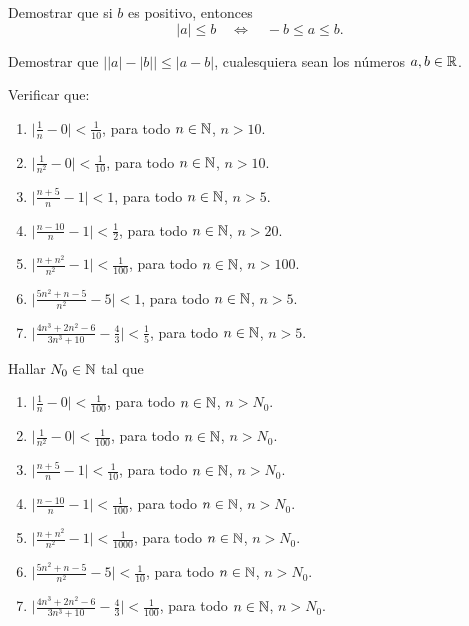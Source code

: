     \item* Demostrar que si $b$ es positivo, entonces
    \[
        |a| \le b \quad\iff\quad -b \le a \le b.
    \]

    \item Demostrar que $\big| |a|-|b| \big| \le |a-b|$, cualesquiera sean los números $a,b\in\mathbb{R}$.



    \item Verificar que:
    \begin{enumerate}
        \item $\Big|\frac1n - 0\Big| < \frac1{10}$, para todo $n\in\mathbb{N}$, $n > 10$.
        \item $\Big|\frac1{n^2} - 0\Big| < \frac1{10}$, para todo $n\in\mathbb{N}$, $n > 10$.
        \item $\Big|\frac{n + 5}n-1 \Big|< 1$, para todo $n\in\mathbb{N}$, $n > 5$.
        \item $\Big|\frac{n - 10}n-1\Big| < \frac12$, para todo $n\in\mathbb{N}$, $n > 20$.
        \item $\Big|\frac{n+n^2}{n^2} - 1\Big| < \frac1{100}$, para todo $n\in\mathbb{N}$, $n > 100$.
        \item $\Big| \frac{5n^2 + n - 5}{n^2}-5\Big| < 1 $, para todo $n\in\mathbb{N}$, $n > 5$.
        \item $\Big| \frac{4n^3+2n^2-6}{3n^3+10} - \frac43\Big|  < \frac1{5}$, para todo $n\in\mathbb{N}$, $n > 5$.
    \end{enumerate}


    \item Hallar $N_0\in\mathbb{N}$ tal que
        \begin{enumerate}
            \item $\Big|\frac1n - 0\Big| < \frac1{100}$, para todo $n\in\mathbb{N}$, $n > N_0$.
            \item $\Big|\frac1{n^2} - 0\Big| < \frac1{100}$, para todo $n\in\mathbb{N}$, $n > N_0$.
            \item $\Big|\frac{n + 5}n-1 \Big|< \frac1{10}$, para todo $n\in\mathbb{N}$, $n > N_0$.
            \item $\Big|\frac{n - 10}n-1\Big| < \frac1{100}$, para todo $n\in\mathbb{N}$, $n > N_0$.
            \item $\Big|\frac{n+n^2}{n^2} - 1\Big| < \frac1{1000}$, para todo $n\in\mathbb{N}$, $n > N_0$.
            \item $\Big| \frac{5n^2 + n - 5}{n^2}-5\Big| < \frac1{10} $, para todo $n\in\mathbb{N}$, $n > N_0$.
            \item $\Big| \frac{4n^3+2n^2-6}{3n^3+10} - \frac43\Big|  < \frac1{100}$, para todo $n\in\mathbb{N}$, $n > N_0$.
        \end{enumerate}


